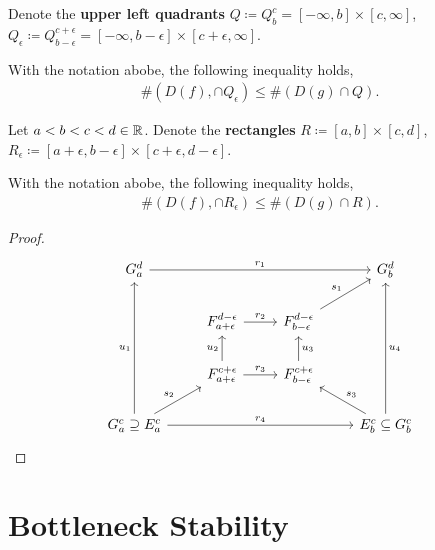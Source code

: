 Denote the {\bf upper left quadrants} $ Q \coloneq Q_b^c = [-\infty, b] \times [c, \infty] $, $ Q_\epsilon \coloneq Q_{b-\epsilon}^{c+\epsilon} = [-\infty, b-\epsilon] \times [c+\epsilon, \infty] $.

\begin{lemma} \label{lemma:quadrant-lemma}
    With the notation abobe, the following inequality holds,
    \begin{align}
        \#(D(f), \cap Q_\epsilon) \leq \#(D(g) \cap Q).
    \end{align}
\end{lemma}

Let $ a < b < c < d \in \mathbb R $. Denote the {\bf rectangles} $ R \coloneq [a, b] \times [c, d] $, $ R_\epsilon \coloneq [a+\epsilon, b-\epsilon] \times [c+\epsilon, d -\epsilon] $.

\begin{lemma} \label{lemma:box-lemma}
    With the notation abobe, the following inequality holds,
    \begin{align}
        \#(D(f), \cap R_\epsilon) \leq \#(D(g) \cap R).
    \end{align}
\end{lemma}
\begin{proof}
    $$
    \begin{tikzcd}
        G_a^d \arrow[rrr, "r_1"]
        &
        &
        & G_b^d \\
        & F_{a+\epsilon}^{d-\epsilon} \arrow[r, "r_2"]
        & F_{b-\epsilon}^{d-\epsilon} \arrow[ru, "s_1"]
        & \\
                                                                                      & F_{a+\epsilon}^{c+\epsilon} \arrow[u, "u_2"] \arrow[r, "r_3"] & F_{b-\epsilon}^{c+\epsilon} \arrow[u, "u_3"'] &                                                              \\
        G_a^c \supseteq E_a^c \arrow[ru, "s_2"] \arrow[uuu, "u_1"] \arrow[rrr, "r_4"] &                                                               &                                               & E_b^c \subseteq G_b^c \arrow[lu, "s_3"'] \arrow[uuu, "u_4"']
        \end{tikzcd}
    $$
\end{proof}

\section{Bottleneck Stability}


